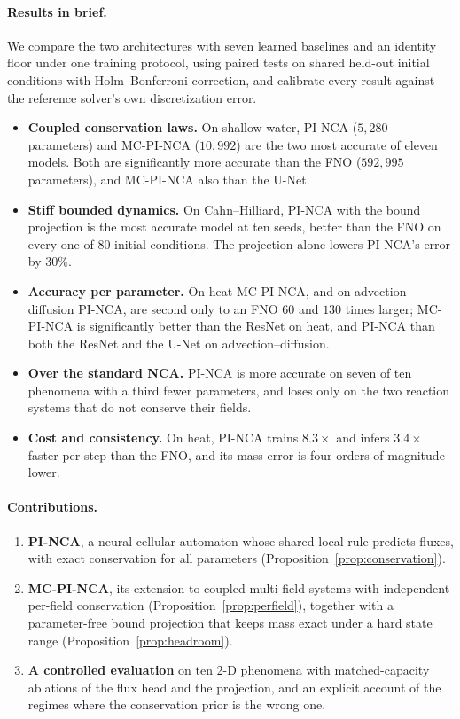 \documentclass{article}
\begin{document}
\paragraph{Results in brief.} We compare the two architectures with seven learned baselines
and an identity floor under one training protocol, using paired tests on shared held-out
initial conditions with Holm--Bonferroni correction, and calibrate every result against
the reference solver's own discretization error.
\begin{itemize}
\item \textbf{Coupled conservation laws.} On shallow water, PI-NCA ($5{,}280$ parameters)
and MC-PI-NCA ($10{,}992$) are the two most accurate of eleven models. Both are
significantly more accurate than the FNO ($592{,}995$ parameters), and MC-PI-NCA also
than the U-Net.
\item \textbf{Stiff bounded dynamics.} On Cahn--Hilliard, PI-NCA with the bound projection
is the most accurate model at ten seeds, better than the FNO on every one of 80 initial
conditions. The projection alone lowers PI-NCA's error by $30\%$.
\item \textbf{Accuracy per parameter.} On heat MC-PI-NCA, and on advection--diffusion
PI-NCA, are second only to an FNO $60$ and $130$ times larger; MC-PI-NCA is significantly
better than the ResNet on heat, and PI-NCA than both the ResNet and the U-Net on
advection--diffusion.
\item \textbf{Over the standard NCA.} PI-NCA is more accurate on seven of ten phenomena
with a third fewer parameters, and loses only on the two reaction systems that do not
conserve their fields.
\item \textbf{Cost and consistency.} On heat, PI-NCA trains $8.3\times$ and infers
$3.4\times$ faster per step than the FNO, and its mass error is four orders of magnitude
lower.
\end{itemize}

\paragraph{Contributions.}
\begin{enumerate}
\item \textbf{PI-NCA}, a neural cellular automaton whose shared local rule predicts
fluxes, with exact conservation for all parameters (Proposition~\ref{prop:conservation}).
\item \textbf{MC-PI-NCA}, its extension to coupled multi-field systems with independent
per-field conservation (Proposition~\ref{prop:perfield}), together with a parameter-free
bound projection that keeps mass exact under a hard state range
(Proposition~\ref{prop:headroom}).
\item \textbf{A controlled evaluation} on ten 2-D phenomena with matched-capacity
ablations of the flux head and the projection, and an explicit account of the regimes
where the conservation prior is the wrong one.
\end{enumerate}
\end{document}
